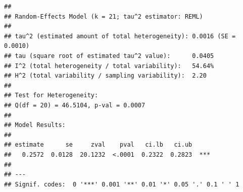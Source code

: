 \documentclass[
]{article}
\newenvironment{Shaded}{\begin{snugshade}}{\end{snugshade}}
\newcommand{\AttributeTok}[1]{\textcolor[rgb]{0.77,0.63,0.00}{#1}}
\newcommand{\ControlFlowTok}[1]{\textcolor[rgb]{0.13,0.29,0.53}{\textbf{#1}}}
\newcommand{\DecValTok}[1]{\textcolor[rgb]{0.00,0.00,0.81}{#1}}
\newcommand{\FunctionTok}[1]{\textcolor[rgb]{0.00,0.00,0.00}{#1}}
\newcommand{\NormalTok}[1]{#1}
\newcommand{\OtherTok}[1]{\textcolor[rgb]{0.56,0.35,0.01}{#1}}
\newcommand{\SpecialCharTok}[1]{\textcolor[rgb]{0.00,0.00,0.00}{#1}}
\newcommand{\StringTok}[1]{\textcolor[rgb]{0.31,0.60,0.02}{#1}}
\begin{document}
\begin{Shaded}
\end{Shaded}

\begin{verbatim}
## 
## Random-Effects Model (k = 21; tau^2 estimator: REML)
## 
## tau^2 (estimated amount of total heterogeneity): 0.0016 (SE = 0.0010)
## tau (square root of estimated tau^2 value):      0.0405
## I^2 (total heterogeneity / total variability):   54.64%
## H^2 (total variability / sampling variability):  2.20
## 
## Test for Heterogeneity:
## Q(df = 20) = 46.5104, p-val = 0.0007
## 
## Model Results:
## 
## estimate      se     zval    pval   ci.lb   ci.ub 
##   0.2572  0.0128  20.1232  <.0001  0.2322  0.2823  *** 
## 
## ---
## Signif. codes:  0 '***' 0.001 '**' 0.01 '*' 0.05 '.' 0.1 ' ' 1
\end{verbatim}
\end{document}
